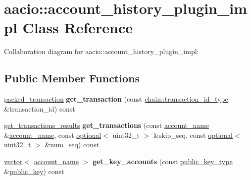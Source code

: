 \hypertarget{classaacio_1_1account__history__plugin__impl}{}\section{aacio\+:\+:account\+\_\+history\+\_\+plugin\+\_\+impl Class Reference}
\label{classaacio_1_1account__history__plugin__impl}


Collaboration diagram for aacio\+:\+:account\+\_\+history\+\_\+plugin\+\_\+impl\+:
\subsection*{Public Member Functions}
\begin{DoxyCompactItemize}
\item 
\mbox{\label{classaacio_1_1account__history__plugin__impl_ac55a9c25842a42ede43f365d31a8cad7}} 
\mbox{\hyperlink{structaacio_1_1chain_1_1packed__transaction}{packed\+\_\+transaction}} {\bfseries get\+\_\+transaction} (const \mbox{\hyperlink{classfc_1_1sha256}{chain\+::transaction\+\_\+id\+\_\+type}} \&transaction\+\_\+id) const
\item 
\mbox{\label{classaacio_1_1account__history__plugin__impl_abb1882e0e37be34bbd7daf9fe06ebcba}} 
\mbox{\hyperlink{structaacio_1_1account__history__apis_1_1read__only_1_1get__transactions__results}{get\+\_\+transactions\+\_\+results}} {\bfseries get\+\_\+transactions} (const \mbox{\hyperlink{structaacio_1_1chain_1_1name}{account\+\_\+name}} \&\mbox{\hyperlink{structaacio_1_1chain_1_1name}{account\+\_\+name}}, const \mbox{\hyperlink{classaacio_1_1optional}{optional}}$<$ uint32\+\_\+t $>$ \&skip\+\_\+seq, const \mbox{\hyperlink{classaacio_1_1optional}{optional}}$<$ uint32\+\_\+t $>$ \&num\+\_\+seq) const
\item 
\mbox{\label{classaacio_1_1account__history__plugin__impl_a35f4e9ad3cf31751127dfd97066d7cbe}} 
\mbox{\hyperlink{classstd_1_1vector}{vector}}$<$ \mbox{\hyperlink{structaacio_1_1chain_1_1name}{account\+\_\+name}} $>$ {\bfseries get\+\_\+key\+\_\+accounts} (const \mbox{\hyperlink{classfc_1_1crypto_1_1public__key}{public\+\_\+key\+\_\+type}} \&\mbox{\hyperlink{structaacio_1_1public__key}{public\+\_\+key}}) const

\end{DoxyCompactItemize}
